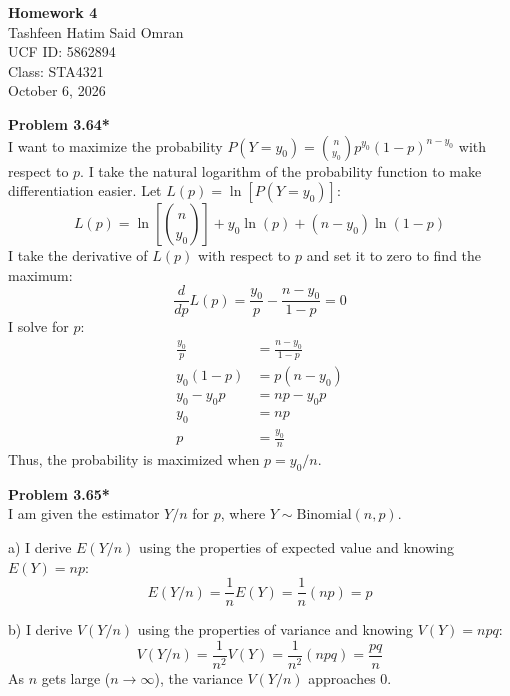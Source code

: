 \documentclass[12pt]{article}
\begin{document}
\begin{center}
\textbf{\Large Homework 4} \\
Tashfeen Hatim Said Omran \\
UCF ID: 5862894 \\
Class: STA4321 \\
October 6, 2026
\end{center}

\textbf{Problem 3.64*} \\
I want to maximize the probability $P(Y = y_0) = \binom{n}{y_0} p^{y_0} (1-p)^{n-y_0}$ with respect to $p$. I take the natural logarithm of the probability function to make differentiation easier. Let $L(p) = \ln[P(Y = y_0)]$:
\[ L(p) = \ln\left[\binom{n}{y_0}\right] + y_0 \ln(p) + (n - y_0) \ln(1 - p) \]
I take the derivative of $L(p)$ with respect to $p$ and set it to zero to find the maximum:
\[ \frac{d}{dp} L(p) = \frac{y_0}{p} - \frac{n - y_0}{1 - p} = 0 \]
I solve for $p$:
\begin{align*}
\frac{y_0}{p} &= \frac{n - y_0}{1 - p} \\
y_0(1 - p) &= p(n - y_0) \\
y_0 - y_0p &= np - y_0p \\
y_0 &= np \\
p &= \frac{y_0}{n}
\end{align*}
Thus, the probability is maximized when $p = y_0/n$.

\textbf{Problem 3.65*} \\
I am given the estimator $Y/n$ for $p$, where $Y \sim \text{Binomial}(n, p)$.

a) I derive $E(Y/n)$ using the properties of expected value and knowing $E(Y) = np$:
\[ E(Y/n) = \frac{1}{n}E(Y) = \frac{1}{n}(np) = p \]

b) I derive $V(Y/n)$ using the properties of variance and knowing $V(Y) = npq$:
\[ V(Y/n) = \frac{1}{n^2}V(Y) = \frac{1}{n^2}(npq) = \frac{pq}{n} \]
As $n$ gets large ($n \to \infty$), the variance $V(Y/n)$ approaches 0.
\end{document}
